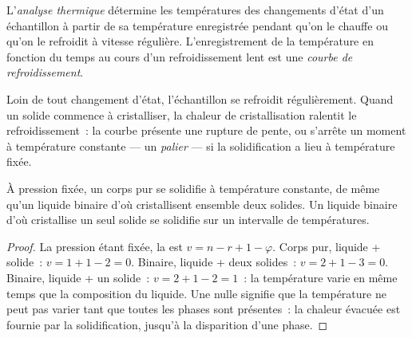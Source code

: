 \begin{definition}\label{def:b2:solid-liquid-diagrams:cooling-curve}
L'\emph{analyse thermique} détermine les températures
des changements d'état d'un échantillon à partir de sa température enregistrée pendant qu'on le
chauffe ou qu'on le refroidit à vitesse régulière. L'enregistrement de la température en fonction du temps
au cours d'un refroidissement lent est une \emph{courbe de refroidissement}.
\end{definition}

Loin de tout changement d'état, l'échantillon se refroidit régulièrement. Quand un solide commence à
cristalliser, la chaleur de cristallisation ralentit le refroidissement~: la courbe présente une
rupture de pente, ou s'arrête un moment à température constante --- un
\textit{palier} --- si la solidification a lieu à température fixée.

\begin{proposition}[Paliers]\label{prop:b2:solid-liquid-diagrams:plateaus}
À pression fixée, un corps pur se solidifie à température constante, de même
qu'un liquide binaire d'où cristallisent ensemble deux solides. Un liquide binaire
d'où cristallise un seul solide se solidifie sur un intervalle de températures.
\end{proposition}

\begin{proof}
La pression étant fixée, la  est $v = n - r + 1 - \varphi$. Corps
pur, liquide + solide~: $v = 1 + 1 - 2 = 0$. Binaire, liquide + deux solides~:
$v = 2 + 1 - 3 = 0$. Binaire, liquide + un solide~: $v = 2 + 1 - 2 = 1$~: la
température varie en même temps que la composition du liquide. Une  nulle signifie que la
température ne peut pas varier tant que toutes les phases sont présentes~: la chaleur évacuée est
fournie par la solidification, jusqu'à la disparition d'une phase.
\end{proof}

